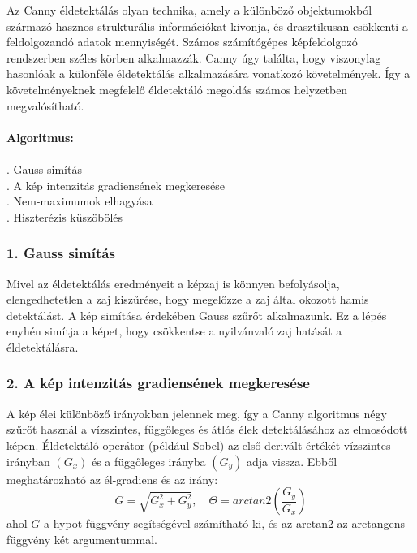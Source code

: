 

Az Canny éldetektálás olyan technika, amely a különböző objektumokból származó hasznos strukturális információkat kivonja, és drasztikusan csökkenti a feldolgozandó adatok mennyiségét. Számos számítógépes képfeldolgozó rendszerben széles körben alkalmazzák. Canny úgy találta, hogy viszonylag hasonlóak a különféle éldetektálás alkalmazására vonatkozó követelmények. Így a követelményeknek megfelelő éldetektáló megoldás számos helyzetben megvalósítható. 
\\ \\
\textbf{Algoritmus:}\\ \\
. Gauss simítás\\
. A kép intenzitás gradiensének megkeresése\\
. Nem-maximumok elhagyása\\
. Hiszterézis küszöbölés \\ 

\subsubsection{1. Gauss simítás}

Mivel az éldetektálás eredményeit a képzaj is könnyen befolyásolja, elengedhetetlen a zaj kiszűrése, hogy megelőzze a zaj által okozott hamis detektálást. A kép simítása érdekében Gauss szűrőt alkalmazunk. Ez a lépés enyhén simítja a képet, hogy csökkentse a nyilvánvaló zaj hatását a éldetektálásra.

\subsubsection{2. A kép intenzitás gradiensének megkeresése}

A kép élei különböző irányokban jelennek meg, így a Canny algoritmus négy szűrőt használ a vízszintes, függőleges és átlós élek detektálásához az elmosódott képen. Éldetektáló operátor (például Sobel) az első derivált értékét vízszintes irányban $(G_x)$ és a függőleges irányba $(G_y)$ adja vissza. Ebből meghatározható az él-gradiens és az irány:
$$
G = \sqrt{G_{x}^{2}+G_{y}^{2}},
\quad
\Theta = arctan2\left(\frac{G_y}{G_x}\right)
$$
ahol $G$ a hypot függvény segítségével számítható ki, és az arctan2 az arctangens függvény két argumentummal.

